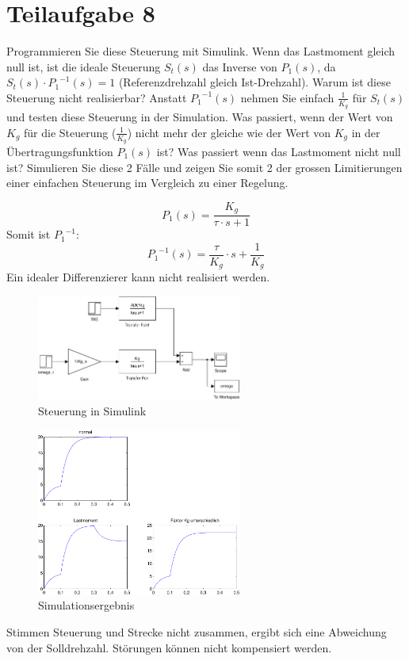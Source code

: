 \section{Teilaufgabe 8}
\begin{aufgabe}
    Programmieren Sie diese Steuerung mit Simulink. Wenn das Lastmoment gleich 
    null ist, ist die ideale Steuerung $S_t(s)$ das Inverse von $P_1(s)$, da 
    $S_t(s) \cdot {P_1}^{-1}(s) = 1$ (Referenzdrehzahl gleich Ist-Drehzahl). 
    Warum ist diese Steuerung nicht realisierbar? Anstatt ${P_1}^{-1}(s)$ 
    nehmen Sie einfach $\frac{1}{K_g}$ für $S_t(s)$ und testen diese Steuerung 
    in der Simulation.  Was passiert, wenn der Wert von $K_g$ für die 
    Steuerung ($\frac{1}{K_g}$) nicht mehr der gleiche wie der Wert von $K_g$ 
    in der Übertragungsfunktion $P_1(s)$ ist? Was passiert wenn das Lastmoment 
    nicht null ist? Simulieren Sie diese 2 Fälle und zeigen Sie somit 2 
    der grossen Limitierungen einer einfachen Steuerung im Vergleich zu einer 
    Regelung.
\end{aufgabe}
\[ P_1(s) = \frac{K_g}{\tau \cdot s + 1} \]
Somit ist ${P_1}^{-1}$:
\[ {P_1}^{-1}(s) = \frac{\tau}{K_g} \cdot s + \frac{1}{K_g} \]
Ein idealer Differenzierer kann nicht realisiert werden. 
\begin{figure}[h!]
    \centering
    \includegraphics[width=0.6\textwidth]{08/steuerung.pdf}
    \caption{Steuerung in Simulink}
    \label{fig:03}
\end{figure}
\begin{figure}[h!]
    \centering
    \includegraphics[width=0.6\textwidth]{08/steuerung_plot.pdf}
    \caption{Simulationsergebnis}
    \label{fig:08plot}
\end{figure}

Stimmen Steuerung und Strecke nicht zusammen, ergibt sich eine Abweichung 
von der Solldrehzahl. Störungen können nicht kompensiert werden. 
